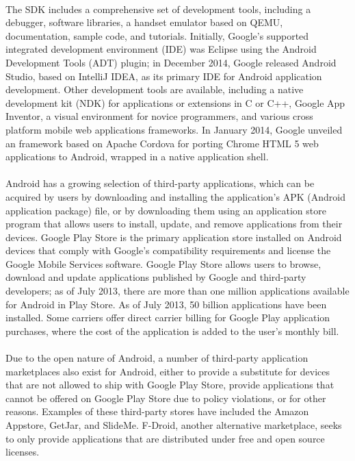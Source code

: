 \documentclass[a4paper,12pt]{report}
\begin{document}
\paragraph{}The SDK includes a comprehensive set of development tools, including a debugger, software libraries, a handset emulator based on QEMU, documentation, sample code, and tutorials. Initially, Google's supported integrated development environment (IDE) was Eclipse using the Android Development Tools (ADT) plugin; in December 2014, Google released Android Studio, based on IntelliJ IDEA, as its primary IDE for Android application development. Other development tools are available, including a native development kit (NDK) for applications or extensions in C or C++, Google App Inventor, a visual environment for novice programmers, and various cross platform mobile web applications frameworks. In January 2014, Google unveiled an framework based on Apache Cordova for porting Chrome HTML 5 web applications to Android, wrapped in a native application shell.
\paragraph{}Android has a growing selection of third-party applications, which can be acquired by users by downloading and installing the application's APK (Android application package) file, or by downloading them using an application store program that allows users to install, update, and remove applications from their devices. Google Play Store is the primary application store installed on Android devices that comply with Google's compatibility requirements and license the Google Mobile Services software. Google Play Store allows users to browse, download and update applications published by Google and third-party developers; as of July 2013, there are more than one million applications available for Android in Play Store. As of July 2013, 50 billion applications have been installed. Some carriers offer direct carrier billing for Google Play application purchases, where the cost of the application is added to the user's monthly bill.
\paragraph{}Due to the open nature of Android, a number of third-party application marketplaces also exist for Android, either to provide a substitute for devices that are not allowed to ship with Google Play Store, provide applications that cannot be offered on Google Play Store due to policy violations, or for other reasons. Examples of these third-party stores have included the Amazon Appstore, GetJar, and SlideMe. F-Droid, another alternative marketplace, seeks to only provide applications that are distributed under free and open source licenses.
\end{document}
